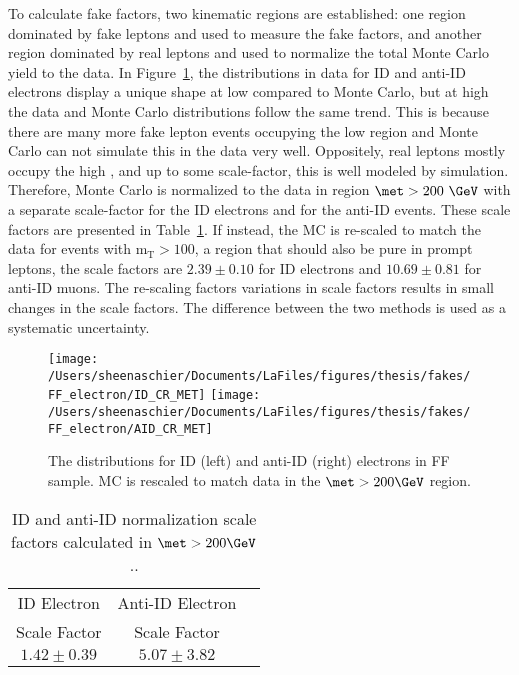 To calculate fake factors, two kinematic regions are established: one region dominated by fake leptons and used to measure the fake factors, and another region dominated by real leptons and used to normalize the total Monte Carlo yield to the data.  In Figure~\ref{fig:elec_FF_met}, the \met distributions in data for ID and anti-ID electrons display a unique shape at low \met compared to Monte Carlo, but at high \met the data and Monte Carlo distributions follow the same trend.  This is because there are many more fake lepton events occupying the low \met region and Monte Carlo can not simulate this in the data very well.  Oppositely, real leptons mostly occupy the high \met, and up to some scale-factor, this is well modeled by simulation.  Therefore, Monte Carlo is normalized to the data in region $\met > 200~\GeV$ with a separate scale-factor for the ID electrons and for the anti-ID events.  These scale factors are presented in Table~\ref{tab:ff_ele_sf}.  If instead, the MC is re-scaled to match the data for events with $\mathrm{m_T} > 100$\GeV, a region that should also be pure in prompt leptons, the scale factors are $2.39 \pm 0.10$ for ID electrons and $10.69\pm 0.81$ for anti-ID muons.  The re-scaling factors variations in scale factors results in small changes in the scale factors.  The difference between the two methods is used as a systematic uncertainty.
\begin{figure}[tbp]
  \centering
  \texttt{[image: /Users/sheenaschier/Documents/LaFiles/figures/thesis/fakes/FF\_electron/ID\_CR\_MET]}
  \texttt{[image: /Users/sheenaschier/Documents/LaFiles/figures/thesis/fakes/FF\_electron/AID\_CR\_MET]}
  \caption{The \met{} distributions for ID (left) and anti-ID (right) electrons in FF sample.  MC is rescaled to match data in the $\met > 200\GeV$ region.}
  \label{fig:elec_FF_met}
\end{figure}
\begin{table}[tbp]
  \centering
  \begin{tabular}{|c|c|c|}
    \hline
    ID Electron  & Anti-ID Electron \\ 
    Scale Factor & Scale Factor\\
    \hline
    $1.42\pm0.39$ &  $5.07\pm3.82$  \\
\hline

    \hline
  \end{tabular}
  \caption{ID and anti-ID normalization scale factors calculated in $\met > 200\GeV$..}
  \label{tab:ff_ele_sf}
\end{table} 

